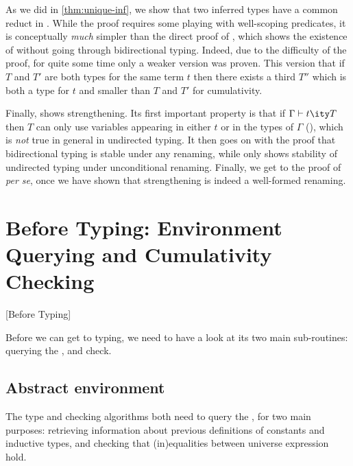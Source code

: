 As we did in \cref{thm:unique-inf}, we show that two inferred types have a common reduct in
. While the proof requires some playing with
well-scoping predicates,%
it is conceptually \emph{much} simpler than the direct proof of ,
which shows the existence of  without going through bidirectional typing.
Indeed, due to the difficulty of the proof,
for quite some time only a weaker version was proven.
This version that if $T$ and $T'$ are both types
for the same term $t$ then there exists a third $T''$ which
is both a type for $t$ and smaller than 
$T$ and $T'$ for cumulativity.

Finally,  shows strengthening.
Its first important property is that if $\Gamma \vdash t \ity T$ then
$T$ can only use variables appearing in either $t$ or in the types of $\Gamma$
(),
which is \emph{not} true in general in undirected typing.%
It then goes on with the proof that bidirectional typing is stable under any renaming, while
 only shows stability of undirected typing under unconditional renaming.
Finally, we get to the proof of 
\textit{per se}, once we have shown that strengthening is indeed a well-formed renaming.

\section{Before Typing: Environment Querying and Cumulativity Checking}[Before Typing]
\label{sec:kernel-subroutines}

Before we can get to typing, we need to have a look at its two main sub-routines:
querying the , and  check.

\subsection{Abstract environment}

The type and  checking algorithms both need to query the ,
for two main purposes: retrieving information about previous definitions
of constants and inductive types, and checking that (in)equalities between
universe expression hold.

